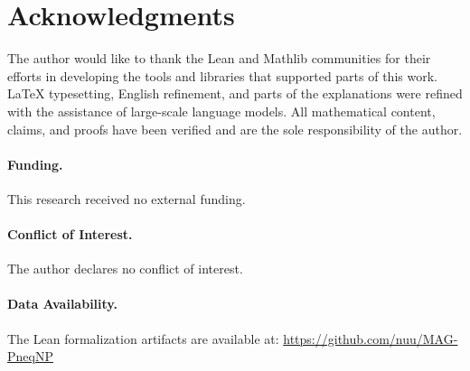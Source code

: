\documentclass[11pt,a4paper]{article}
\theoremstyle{plain}
\theoremstyle{definition}
\begin{document}
\section*{Acknowledgments}
The author would like to thank the Lean and Mathlib communities for their efforts in developing the tools and libraries that supported parts of this work. LaTeX typesetting, English refinement, and parts of the explanations were refined with the assistance of large-scale language models. All mathematical content, claims, and proofs have been verified and are the sole responsibility of the author.

\paragraph{Funding.}
This research received no external funding.

\paragraph{Conflict of Interest.}
The author declares no conflict of interest.

\paragraph{Data Availability.}
The Lean formalization artifacts are available at:
\url{https://github.com/nuu/MAG-PneqNP}
\end{document}
